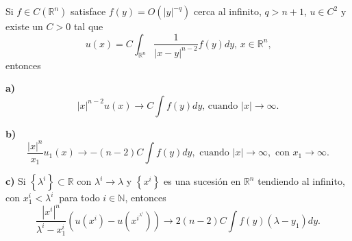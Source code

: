 



\begin{lemma}
Si $f\in C(\mathbb{R}^{n})$ satisface $f\left(  y\right)  =O\left(  \left\vert
y\right\vert ^{-q}\right)  $ cerca al infinito, \linebreak$q>n+1$, $u\in
C^{2}$ y existe un $C>0$ tal que
\[
u\left(  x\right)  =C\int_{\mathbb{R}^{n}}\dfrac{1}{\left\vert x-y\right\vert
^{n-2}}f\left(  y\right)  dy\text{, \ \ }x\in\mathbb{R}^{n}\text{,}%
\]
entonces

\textbf{a)}
\[
\left|  x\right|  ^{n-2}u(x)\longrightarrow C\int f\left(  y\right)  dy\text{,
\ \ cuando }\left|  x\right|  \rightarrow\infty.
\]


\textbf{b)}
\[
\frac{\left|  x\right|  ^{n}}{x_{1}}u_{1}\left(  x\right)  \longrightarrow
-\left(  n-2\right)  C\int f\left(  y\right)  dy,\text{ \ cuando }\left|
x\right|  \rightarrow\infty,\text{\ con }x_{1}\rightarrow\infty\text{.}%
\]


\textbf{c) }Si $\left\{  \lambda^{i}\right\}  \subset\mathbb{R}$ con
$\lambda^{i}\longrightarrow\lambda$ y $\left\{  x^{i}\right\}  $ es una
sucesi\'{o}n en $\mathbb{R}^{n}$ tendiendo al infinito, con $x_{1}^{i}%
<\lambda^{i}$ $\ $para todo $i\in\mathbb{N}$, entonces
\[
\frac{\left\vert x^{i}\right\vert ^{n}}{\lambda^{i}-x_{1}^{i}}\left(  u\left(
x^{i}\right)  -u\left(  x^{i^{\lambda^{i}}}\right)  \right)  \longrightarrow
2\left(  n-2\right)  C\int f\left(  y\right)  \left(  \lambda-y_{1}\right)
dy.
\]

\end{lemma}
